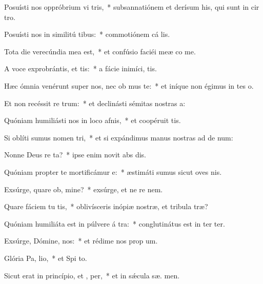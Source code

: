 \item Posuísti nos oppróbrium vi tris,~* subsannatiónem et derísum his, qui sunt in cir tro.
\item Posuísti nos in similitú tibus:~* commotiónem cá  lis.
\item Tota die verecúndia mea   est,~* et confúsio faciéi meæ co me.
\item A voce exprobrántis, et tis:~* a fácie inimíci,  tis.
\item Hæc ómnia venérunt super nos, nec ob mus te:~* et iníque non égimus in tes o.
\item Et non recéssit re  trum:~* et declinásti sémitas nostras   a:
\item Quóniam humiliásti nos in loco afnis,~* et coopéruit   tis.
\item Si oblíti sumus nomen  tri,~* et si expándimus manus nostras ad de num:
\item Nonne Deus re ta?~* ipse enim novit abs dis.
\item Quóniam propter te mortificámur  e:~* æstimáti sumus sicut oves nis.
\item Exsúrge, quare ob, mine?~* exsúrge, et ne re  nem.
\item Quare fáciem tu tis,~* oblivísceris inópiæ nostræ, et tribula træ?
\item Quóniam humiliáta est in púlvere á tra:~* conglutinátus est in ter  ter.
\item Exsúrge, Dómine,  nos:~* et rédime nos prop  um.
\item Glória Pa,  lio,~* et Spi to.
\item Sicut erat in princípio, et ,  per,~* et in sǽcula sæ. men.
